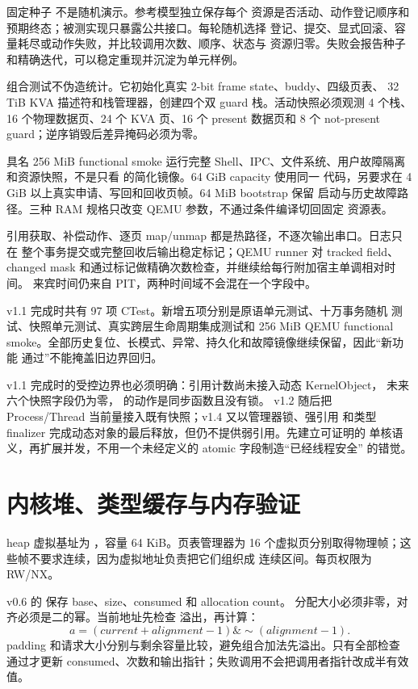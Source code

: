 固定种子  不是随机演示。参考模型独立保存每个
资源是否活动、动作登记顺序和预期终态；被测实现只暴露公共接口。每轮随机选择
登记、提交、显式回滚、容量耗尽或动作失败，并比较调用次数、顺序、状态与
资源归零。失败会报告种子和精确迭代，可以稳定重现并沉淀为单元样例。

组合测试不伪造统计。它初始化真实 2-bit frame state、buddy、四级页表、
32 TiB KVA 描述符和栈管理器，创建四个双 guard 栈。活动快照必须观测
4 个栈、16 个物理数据页、24 个 KVA 页、16 个 present 数据页和 8 个
not-present guard；逆序销毁后差异掩码必须为零。

具名 256 MiB functional smoke 运行完整 Shell、IPC、文件系统、用户故障隔离
和资源快照，不是只看  的简化镜像。64 GiB capacity 使用同一
代码，另要求在 4 GiB 以上真实申请、写回和回收页帧。64 MiB bootstrap 保留
启动与历史故障路径。三种 RAM 规格只改变 QEMU 参数，不通过条件编译切回固定
资源表。

引用获取、补偿动作、逐页 map/unmap 都是热路径，不逐次输出串口。日志只在
整个事务提交或完整回收后输出稳定标记；QEMU runner 对 tracked field、
changed mask 和通过标记做精确次数检查，并继续给每行附加宿主单调相对时间。
来宾时间仍来自 PIT，两种时间域不会混在一个字段中。

v1.1 完成时共有 97 项 CTest。新增五项分别是原语单元测试、十万事务随机
测试、快照单元测试、真实跨层生命周期集成测试和 256 MiB QEMU functional
smoke。全部历史复位、长模式、异常、持久化和故障镜像继续保留，因此“新功能
通过”不能掩盖旧边界回归。

v1.1 完成时的受控边界也必须明确：引用计数尚未接入动态 KernelObject，
未来六个快照字段仍为零， 的动作是同步函数且没有锁。
v1.2 随后把 Process/Thread 当前量接入既有快照；v1.4 又以管理器锁、强引用
和类型 finalizer 完成动态对象的最后释放，但仍不提供弱引用。先建立可证明的
单核语义，再扩展并发，不用一个未经定义的 atomic 字段制造“已经线程安全”
的错觉。

\section{内核堆、类型缓存与内存验证}

heap 虚拟基址为 ，容量 64 KiB。页表管理器为
16 个虚拟页分别取得物理帧；这些帧不要求连续，因为虚拟地址负责把它们组织成
连续区间。每页权限为 RW/NX。

v0.6 的  保存 base、size、consumed 和 allocation count。
分配大小必须非零，对齐必须是二的幂。当前地址先检查
 溢出，再计算：
\[
  a=(current+alignment-1)\mathbin{\&}\sim(alignment-1).
\]
padding 和请求大小分别与剩余容量比较，避免组合加法先溢出。只有全部检查
通过才更新 consumed、次数和输出指针；失败调用不会把调用者指针改成半有效值。

